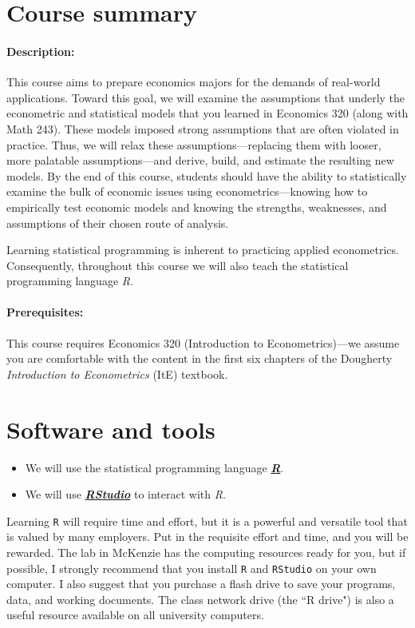 \documentclass[10pt]{article}
\begin{document}
\section*{Course summary}

\paragraph{Description:} This course aims to prepare economics majors for the demands of real-world applications. Toward this goal, we will examine the assumptions that underly the econometric and statistical models that you learned in Economics 320 (along with Math 243). These models imposed strong assumptions that are often violated in practice. Thus, we will relax these assumptions---replacing them with looser, more palatable assumptions---and derive, build, and estimate the resulting new models. By the end of this course, students should have the ability to statistically examine the bulk of economic issues using econometrics---knowing how to empirically test economic models and knowing the strengths, weaknesses, and assumptions of their chosen route of analysis.

Learning statistical programming is inherent to practicing applied econometrics. Consequently, throughout this course we will also teach the statistical programming language \emph{R}.

\paragraph{Prerequisites:} This course requires Economics 320 (Introduction to Econometrics)---we assume you are comfortable with the content in the first six chapters of the Dougherty \textit{Introduction to Econometrics} (ItE) textbook.

\section*{Software and tools}

\begin{itemize}
  \item We will use the statistical programming language \href{https://www.r-project.org/}{\textbf{\emph{R}}}.
  \item We will use \href{https://www.rstudio.com}{\textbf{\emph{RStudio}}} to interact with \emph{R}.
\end{itemize}
Learning \texttt{R} will require time and effort, but it is a powerful and versatile tool that is valued by many employers. Put in the requisite effort and time, and you will be rewarded. The lab in McKenzie has the computing resources ready for you, but if possible, I strongly recommend that you install \texttt{R} and \texttt{RStudio} on your own computer. I also suggest that you purchase a flash drive to save your programs, data, and working documents. The class network drive (the ``R drive") is also a useful resource available on all university computers.
\end{document}
